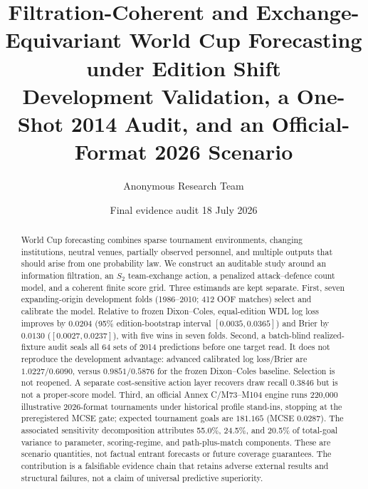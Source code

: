 \documentclass[11pt]{article}
\title{\textbf{Filtration-Coherent and Exchange-Equivariant World Cup Forecasting under Edition Shift}\\
\large Development Validation, a One-Shot 2014 Audit, and an Official-Format 2026 Scenario}
\author{Anonymous Research Team}
\date{Final evidence audit 18 July 2026}
\begin{document}
\maketitle

\begin{abstract}
World Cup forecasting combines sparse tournament environments, changing institutions, neutral
venues, partially observed personnel, and multiple outputs that should arise from one probability
law.  We construct an auditable study around an information filtration, an $S_2$ team-exchange
action, a penalized attack--defence count model, and a coherent finite score grid.  Three estimands
are kept separate.  First, seven expanding-origin development folds (1986--2010; 412 OOF matches)
select and calibrate the model.  Relative to frozen Dixon--Coles, equal-edition WDL log loss improves
by $0.0204$ (95\% edition-bootstrap interval $[0.0035,0.0365]$) and Brier by $0.0130$
($[0.0027,0.0237]$), with five wins in seven folds.  Second, a batch-blind realized-fixture audit
seals all 64 sets of 2014 predictions before one target read.  It does not reproduce the development
advantage: advanced calibrated log loss/Brier are $1.0227/0.6090$, versus $0.9851/0.5876$ for the
frozen Dixon--Coles baseline.  Selection is not reopened.  A separate cost-sensitive action layer
recovers draw recall $0.3846$ but is not a proper-score model.  Third, an official Annex C/M73--M104
engine runs 220,000 illustrative 2026-format tournaments under historical profile stand-ins,
stopping at the preregistered MCSE gate; expected tournament goals are $181.165$ (MCSE $0.0287$).
The associated sensitivity decomposition attributes 55.0\%, 24.5\%, and 20.5\% of total-goal
variance to parameter, scoring-regime, and path-plus-match components.  These are scenario
quantities, not factual entrant forecasts or future coverage guarantees.  The contribution is a
falsifiable evidence chain that retains adverse external results and structural failures, not a
claim of universal predictive superiority.
\end{abstract}
\end{document}
